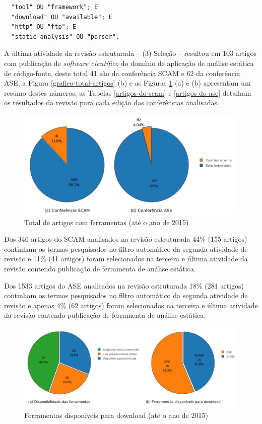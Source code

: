 \begin{verbatim}
  "tool" OU "framework"; E
  "download" OU "available"; E
  "http" OU "ftp"; E
  "static analysis" OU "parser".
\end{verbatim}

A última atividade da revisão estruturada -- (3) Seleção -- resultou em 103
artigos com publicação de {\it software científico} do domínio de aplicação de
análise estática de código-fonte, deste total 41 são da conferência
SCAM e 62 da conferência ASE, a Figura \ref{grafico-total-artigos} (b) e as
Figuras \ref{ferramentas-por-conferencia} (a) e (b) apresentam um resumo destes
números, as Tabelas \ref{artigos-do-scam} e \ref{artigos-do-ase} detalham os
resultados da revisão para cada edição das conferências analisadas.

\begin{figure}[h]
  \center
  \includegraphics[scale=1]{imagens/ferramentas-por-conferencia.png}
  \caption{Total de artigos com ferramentas (até o ano de 2015)}
  \label{ferramentas-por-conferencia}
\end{figure}

Dos 346 artigos do SCAM analisados na revisão estruturada 44\% (155 artigos)
continham os termos pesquisados no filtro automático da segunda atividade de
revisão e 11\% (41 artigos) foram selecionados na terceira e última atividade
da revisão contendo publicação de ferramenta de análise estática.

Dos 1533 artigos do ASE analisados na revisão estruturada 18\% (281 artigos)
continham os termos pesquisados no filtro automático da segunda atividade de
revisão e apenas 4\% (62 artigos) foram selecionados na terceira e última
atividade da revisão contendo publicação de ferramenta de análise estática.

\begin{figure}[h]
  \center
  \includegraphics[scale=0.85]{imagens/ferramentas-disponiveis.png}
  \caption{Ferramentas disponíveis para download (até o ano de 2015)}
  \label{ferramentas-disponiveis}
\end{figure}

